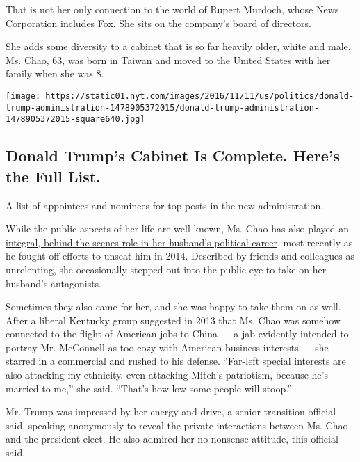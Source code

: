 That is not her only connection to the world of Rupert Murdoch, whose
News Corporation includes Fox. She sits on the company's board of
directors.

She adds some diversity to a cabinet that is so far heavily older, white
and male. Ms. Chao, 63, was born in Taiwan and moved to the United
States with her family when she was 8.

\href{https://www.nytimes.com/interactive/2016/us/politics/donald-trump-administration.html}{}

\texttt{[image: https://static01.nyt.com/images/2016/11/11/us/politics/donald-trump-administration-1478905372015/donald-trump-administration-1478905372015-square640.jpg]}

\hypertarget{donald-trumps-cabinet-is-complete-heres-the-full-list}{%
\subsection{Donald Trump's Cabinet Is Complete. Here's the Full
List.}\label{donald-trumps-cabinet-is-complete-heres-the-full-list}}

A list of appointees and nominees for top posts in the new
administration.

While the public aspects of her life are well known, Ms. Chao has also
played an
\href{http://www.nytimes.com/2014/05/14/us/politics/girding-for-a-fight-mcconnell-enlists-his-wife.html}{integral,
behind-the-scenes role in her husband's political career}, most recently
as he fought off efforts to unseat him in 2014. Described by friends and
colleagues as unrelenting, she occasionally stepped out into the public
eye to take on her husband's antagonists.

Sometimes they also came for her, and she was happy to take them on as
well. After a liberal Kentucky group suggested in 2013 that Ms. Chao was
somehow connected to the flight of American jobs to China --- a jab
evidently intended to portray Mr. McConnell as too cozy with American
business interests --- she starred in a commercial and rushed to his
defense. ``Far-left special interests are also attacking my ethnicity,
even attacking Mitch's patriotism, because he's married to me,'' she
said. ``That's how low some people will stoop.''

Mr. Trump was impressed by her energy and drive, a senior transition
official said, speaking anonymously to reveal the private interactions
between Ms. Chao and the president-elect. He also admired her
no-nonsense attitude, this official said.

